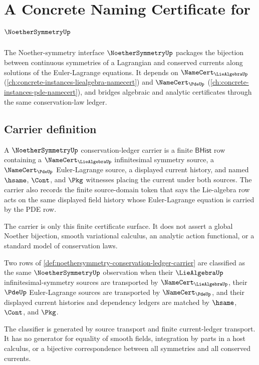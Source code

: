 \chapter{A Concrete Naming Certificate for $\NoetherSymmetryUp$}
\label{ch:concrete-instances-noethersymmetry-namecert}

The Noether-symmetry interface $\NoetherSymmetryUp$ packages the bijection between continuous symmetries of a Lagrangian and conserved currents along solutions of the Euler-Lagrange equations. It depends on $\NameCert_{\LieAlgebraUp}$ (\autoref{ch:concrete-instances-liealgebra-namecert}) and $\NameCert_{\PdeUp}$ (\autoref{ch:concrete-instances-pde-namecert}), and bridges algebraic and analytic certificates through the same conservation-law ledger.

\section{Carrier definition}
\label{sec:noethersymmetry-carrier}

\begin{definition}
\label{def:noethersymmetry-conservation-ledger-carrier}
A $\NoetherSymmetryUp$ conservation-ledger carrier is a finite
$\mathsf{BHist}$ row containing a $\NameCert_{\LieAlgebraUp}$ infinitesimal
symmetry source, a $\NameCert_{\PdeUp}$ Euler-Lagrange source, a displayed
current history, and named $\hsame$, $\Cont$, and $\Pkg$ witnesses placing the
current under both sources. The carrier also records the finite source-domain
token that says the Lie-algebra row acts on the same displayed field history
whose Euler-Lagrange equation is carried by the PDE row.

The carrier is only this finite certificate surface. It does not assert a
global Noether bijection, smooth variational calculus, an analytic action
functional, or a standard model of conservation laws.
\end{definition}

\begin{definition}
\label{def:noethersymmetry-current-classifier}
Two rows of \autoref{def:noethersymmetry-conservation-ledger-carrier} are
classified as the same $\NoetherSymmetryUp$ observation when their
$\LieAlgebraUp$ infinitesimal-symmetry sources are transported by
$\NameCert_{\LieAlgebraUp}$, their $\PdeUp$ Euler-Lagrange sources are
transported by $\NameCert_{\PdeUp}$, and their displayed current histories and
dependency ledgers are matched by $\hsame$, $\Cont$, and $\Pkg$.

The classifier is generated by source transport and finite current-ledger
transport. It has no generator for equality of smooth fields, integration by
parts in a host calculus, or a bijective correspondence between all
symmetries and all conserved currents.
\end{definition}

